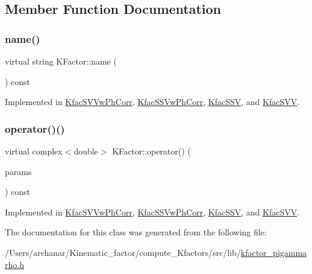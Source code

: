 \subsection{Member Function Documentation}
\mbox{\label{classKFactor_ae578f8d6e4b525895427717da99cab6c}} 
\subsubsection{\texorpdfstring{name()}{name()}}
{\footnotesize\ttfamily virtual string K\+Factor\+::name (\begin{DoxyParamCaption}{ }\end{DoxyParamCaption}) const\hspace{0.3cm}{\ttfamily [pure virtual]}}



Implemented in \mbox{\hyperlink{classKfacSVVwPhCorr_a390641d2f2f421a4d91caceff42d53e8}{Kfac\+S\+V\+Vw\+Ph\+Corr}}, \mbox{\hyperlink{classKfacSSVwPhCorr_a8f314b4585a7d3a9b17795cad0682309}{Kfac\+S\+S\+Vw\+Ph\+Corr}}, \mbox{\hyperlink{classKfacSSV_a72d5e577525fa97365dbcfd4c5bea88d}{Kfac\+S\+SV}}, and \mbox{\hyperlink{classKfacSVV_ad7ab40ec924a678cd785a9743e676d6c}{Kfac\+S\+VV}}.

\mbox{\label{classKFactor_a4273897de4ef590083c7ef208b8d0f18}} 
\subsubsection{\texorpdfstring{operator()()}{operator()()}}
{\footnotesize\ttfamily virtual complex$<$double$>$ K\+Factor\+::operator() (\begin{DoxyParamCaption}\item[{const \mbox{\hyperlink{classKFacParams}{K\+Fac\+Params}} \&}]{params }\end{DoxyParamCaption}) const\hspace{0.3cm}{\ttfamily [pure virtual]}}



Implemented in \mbox{\hyperlink{classKfacSVVwPhCorr_a16ca2be4bad507ad67ab2ce96f056917}{Kfac\+S\+V\+Vw\+Ph\+Corr}}, \mbox{\hyperlink{classKfacSSVwPhCorr_abe3adeddc111ac5016b07086242fd7f1}{Kfac\+S\+S\+Vw\+Ph\+Corr}}, \mbox{\hyperlink{classKfacSSV_ad9bddcf643847eebae9926bbc646c56c}{Kfac\+S\+SV}}, and \mbox{\hyperlink{classKfacSVV_abc4b565ae1fbf1109bbed4b05b3d5ee7}{Kfac\+S\+VV}}.



The documentation for this class was generated from the following file\+:\begin{DoxyCompactItemize}
\item 
/\+Users/archanar/\+Kinematic\+\_\+factor/compute\+\_\+\+Kfactors/src/lib/\mbox{\hyperlink{kfactor__pigammarho_8h}{kfactor\+\_\+pigammarho.\+h}}\end{DoxyCompactItemize}
